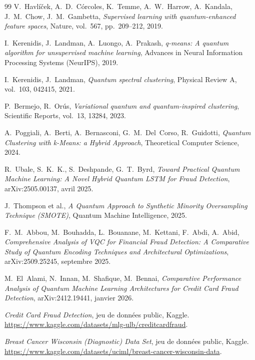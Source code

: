 \documentclass[a4paper]{article}
\begin{document}
\begin{thebibliography}{99}
 V.~Havlíček, A.~D.~Córcoles, K.~Temme, A.~W.~Harrow, A.~Kandala, J.~M.~Chow, J.~M.~Gambetta, \textit{Supervised learning with quantum-enhanced feature spaces}, Nature, vol.~567, pp.~209--212, 2019.

 I.~Kerenidis, J.~Landman, A.~Luongo, A.~Prakash, \textit{q-means: A quantum algorithm for unsupervised machine learning}, Advances in Neural Information Processing Systems (NeurIPS), 2019.

 I.~Kerenidis, J.~Landman, \textit{Quantum spectral clustering}, Physical Review A, vol.~103, 042415, 2021.

 P.~Bermejo, R.~Orús, \textit{Variational quantum and quantum-inspired clustering}, Scientific Reports, vol.~13, 13284, 2023.

 A.~Poggiali, A.~Berti, A.~Bernasconi, G.~M.~Del~Corso, R.~Guidotti, \textit{Quantum Clustering with k-Means: a Hybrid Approach}, Theoretical Computer Science, 2024.


 R.~Ubale, S.~K.~K., S.~Deshpande, G.~T.~Byrd, \textit{Toward Practical Quantum Machine Learning: A Novel Hybrid Quantum LSTM for Fraud Detection}, arXiv:2505.00137, avril 2025.

 J.~Thompson et al., \textit{A Quantum Approach to Synthetic Minority Oversampling Technique (SMOTE)}, Quantum Machine Intelligence, 2025.

 F.~M.~Abbou, M.~Bouhadda, L.~Bouanane, M.~Kettani, F.~Abdi, A.~Abid, \textit{Comprehensive Analysis of VQC for Financial Fraud Detection: A Comparative Study of Quantum Encoding Techniques and Architectural Optimizations}, arXiv:2509.25245, septembre 2025.

 M.~El~Alami, N.~Innan, M.~Shafique, M.~Bennai, \textit{Comparative Performance Analysis of Quantum Machine Learning Architectures for Credit Card Fraud Detection}, arXiv:2412.19441, janvier 2026.


 \textit{Credit Card Fraud Detection}, jeu de données public, Kaggle. \url{https://www.kaggle.com/datasets/mlg-ulb/creditcardfraud}.

 \textit{Breast Cancer Wisconsin (Diagnostic) Data Set}, jeu de données public, Kaggle. \url{https://www.kaggle.com/datasets/uciml/breast-cancer-wisconsin-data}.


\end{thebibliography}
\end{document}
